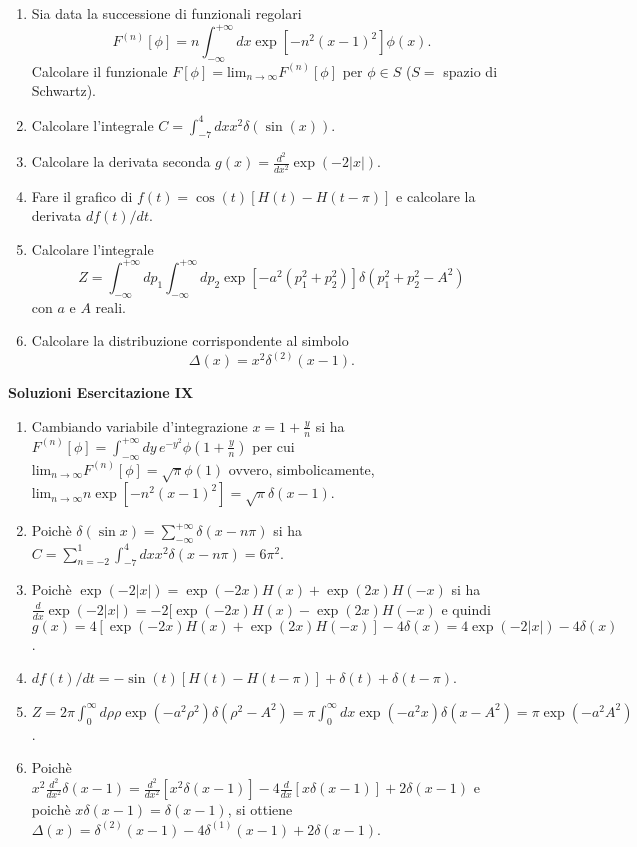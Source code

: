 \documentclass[a4paper,10pt]{article}
\begin{document}
\begin{enumerate}
\item Sia data la successione di funzionali regolari $$ F^{(n)}[\phi]=n
\int_{-\infty}^{+\infty}dx\exp[-n^2(x-1)^2] \phi (x).$$ Calcolare il
funzionale $F[\phi]=\text{lim}_{n\rightarrow \infty} F^{(n)}[\phi]$ per $\phi
\in S$ ($S=$ spazio di Schwartz).
\item Calcolare l'integrale $C=\int_{-7}^4 dx x^2\delta(\sin(x)).$
\item Calcolare la derivata seconda $g(x)=\frac{d^2}{dx^2} \exp(-2|x|).$
\item Fare il grafico di $f(t)=\cos(t) [H(t)-H(t-\pi)]$ e calcolare la
derivata $df(t)/dt.$
\item Calcolare l'integrale
$$Z=\int_{-\infty}^{+\infty}dp_1\int_{-\infty}^{+\infty}dp_2
\exp[-a^2(p_1^2+p_2^2)] \delta(p_1^2+p_2^2-A^2)$$ con $a$ e $A$ reali.
\item Calcolare la distribuzione corrispondente al simbolo
$$\Delta(x)=x^2\delta^{(2)}(x-1).$$  
\end{enumerate}
\newpage

\centerline{\LARGE \bf Soluzioni Esercitazione IX}
\vskip10pt

\begin{enumerate}

\item Cambiando variabile d'integrazione $x=1+\frac{y}{n}$ si ha $F^{(n)}[\phi]=\int_{-\infty}^{+\infty}dy\,e^{-y^2} \phi(1+\frac{y}{n})$ per cui \\
$\text{lim}_{n\rightarrow \infty} F^{(n)}[\phi]=\sqrt{\pi} \phi(1)$ ovvero, simbolicamente, $\text{lim}_{n\rightarrow \infty} n\exp[-n^2(x-1)^2]=\sqrt{\pi} \delta(x-1)$.
\item Poich\`e $\delta(\sin x)= \sum_{-\infty}^{+\infty}\delta(x-n\pi)$ si ha $C=\sum_{n=-2}^1 \int_{-7}^4 dx x^2 \delta(x-n\pi)= 6\pi^2$.
\item Poich\`e $\exp(-2|x|)= \exp(-2x) H(x)+\exp(2x) H(-x)$ si ha $\frac{d}{dx} \exp(-2|x|)=-2[\exp(-2x) H(x)-\exp(2x) H(-x)$ e quindi $g(x)=4[\exp(-2x) H(x)+\exp(2x) H(-x)]-4\delta(x)=4\exp(-2|x|)-4\delta(x)$.
\item $df(t)/dt=-\sin(t)[H(t)-H(t-\pi)]+\delta(t)+\delta(t-\pi)$.
\item $Z=2\pi\int_0^{\infty} d\rho \rho \exp(-a^2\rho^2)\delta(\rho^2-A^2)=\pi \int_0^{\infty} dx \exp(-a^2x)\delta(x-A^2)=\pi \exp(-a^2A^2)$.
\item Poich\`e $x^2 \frac{d^2}{dx^2}\delta(x-1)= \frac{d^2}{dx^2} [x^2\delta(x-1)] -4\frac{d}{dx}[x \delta(x-1)] +2\delta(x-1)$ e poich\`e $x\delta(x-1)=\delta(x-1)$, si ottiene $\Delta(x)=\delta^{(2)}(x-1) -4\delta^{(1)}(x-1)+2\delta(x-1)$.
\end{enumerate}
\end{document}
